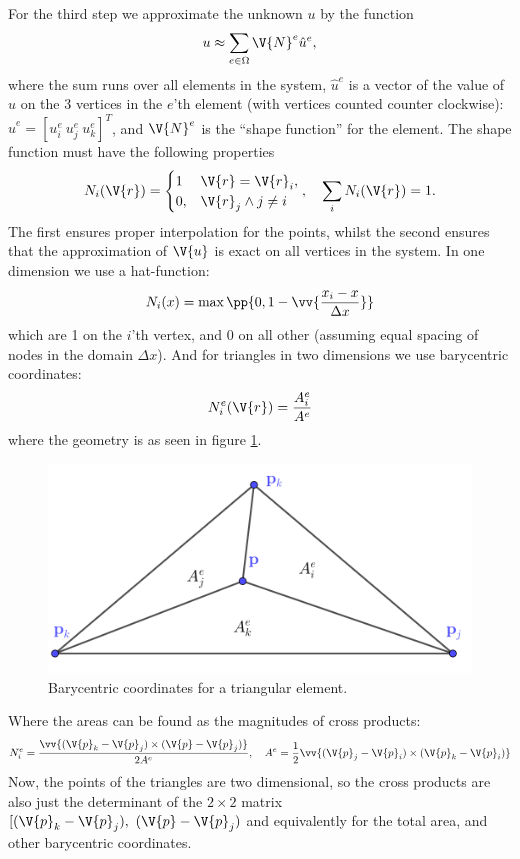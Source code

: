 \documentclass[sigconf]{acmart}
\begin{document}
For the third step we approximate the unknown $ u $ by the function
\begin{equation}\label{key}
	u \approx \sum_{e\in \Omega} \V{N}^e \hat{u}^e,
\end{equation}
where the sum runs over all elements in the system, $ \hat{u}^e $ is a vector of the value of $ u $ on the 3 vertices in the $ e $'th element (with vertices counted counter clockwise): $ \hat{u}^e  = [u_i^e \ u^e_j \ u^e_k]^T $, and $ \V{N}^e $ is the ``shape function'' for the element. The shape function must have the following properties
\begin{equation}\label{key}
	N_i(\V{r}) = \begin{cases}
	1 & \V{r} = \V{r}_i, \\ 0, & \V{r}_j \land j \neq i
	\end{cases}, \quad \sum_{i} N_i(\V{r}) = 1.
\end{equation}
The first ensures proper interpolation for the points, whilst the second ensures that the approximation of $ \V{u} $ is exact on all vertices in the system. In one dimension we use a hat-function:
\begin{equation}\label{key}
	N_i(x) = \max\pp{0, 1- \vv{\frac{x_i - x}{\Delta x}}}
\end{equation}
which are 1 on the $ i $'th vertex, and 0 on all other (assuming equal spacing of nodes in the domain $ \Delta x $). And for triangles in two dimensions we use barycentric coordinates:
\begin{equation}\label{key}
	N_i^e(\V{r}) = \frac{A_i^e}{A^e}
\end{equation}
where the geometry is as seen in figure \ref{fig:barycentric}.
\begin{figure}
	\centering
	\includegraphics[width=0.7\linewidth]{barycentric.png}
	\caption{Barycentric coordinates for a triangular element.}
	\label{fig:barycentric}
\end{figure}
Where the areas can be found as the magnitudes of cross products:
\begin{equation}\label{key}
	N_i^e = \frac{\vv{(\V{p}_k - \V{p}_j) \times (\V{p}-\V{p}_j)}}{2 A^e}, \quad A^e = \frac{1}{2} \vv{(\V{p}_j - \V{p}_i) \times (\V{p}_k - \V{p}_i)}
\end{equation}
Now, the points of the triangles are two dimensional, so the cross products are also just the determinant of the $ 2 \times 2 $ matrix $ [(\V{p}_k - \V{p}_j),  \ (\V{p}-\V{p}_j) $ and equivalently for the total area, and other barycentric coordinates.
\end{document}
